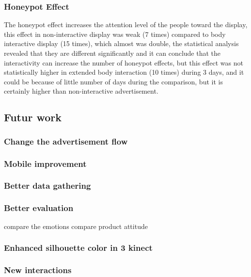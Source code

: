 \subsubsection{Honeypot Effect}
The honeypot effect increases the attention level of the people toward the display, this effect in non-interactive display was weak (7 times) compared to body interactive display (15 times), which almost was double, the statistical analysis revealed that they are different significantly and it can conclude that the interactivity can increase the number of honeypot effects, but this effect was not statistically higher in extended body interaction (10 times) during 3 days, and it could be because of little number of days during the comparison, but it is certainly higher than non-interactive advertisement. 


\subsection{Futur work}

\subsubsection{Change the advertisement flow}

\subsubsection{Mobile improvement}
\subsubsection{Better data gathering}
\subsubsection{Better evaluation}
compare the emotions
compare product attitude


\subsubsection{Enhanced silhouette color in 3 kinect}
\subsubsection{New interactions}






